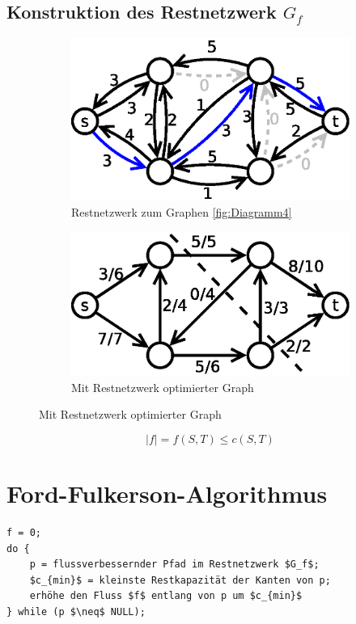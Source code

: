\subsection{Konstruktion des Restnetzwerk $G_f$}
\begin{figure}[H]
\centering
\begin{subfigure}[H]{0.3\linewidth}
\includegraphics[width=\linewidth]{24/Grafik/Diagramm6}
\caption{Restnetzwerk zum Graphen \ref{fig:Diagramm4}}
\end{subfigure}
\begin{subfigure}[H]{0.3\linewidth}
\includegraphics[width=\linewidth]{24/Grafik/Diagramm7}
\caption{Mit Restnetzwerk optimierter Graph}
\end{subfigure}	
\label{fig:Diagramm6}
\end{figure}
\[ |f| = f(S,T) \leq c(S,T) \]
\section{Ford-Fulkerson-Algorithmus}
\begin{lstlisting}[style = pseudo]
f = 0;
do {
	p = flussverbessernder Pfad im Restnetzwerk $G_f$;
	$c_{min}$ = kleinste Restkapazität der Kanten von p;
	erhöhe den Fluss $f$ entlang von p um $c_{min}$
} while (p $\neq$ NULL);
\end{lstlisting}